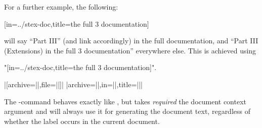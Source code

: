 For a further example, the following:
\begin{center}
    [in=../stex-doc,title={the full \sTeX{}3 documentation}]
\end{center}
will say ``Part III'' (and link accordingly) in the full documentation,
and ``Part III (Extensions) in the full \sTeX{}3 documentation''
everywhere else. This is achieved using

\stexcode"[in=../stex-doc,title={the full \sTeX{}3 documentation}]".

\begin{function}{\extref}
    \begin{syntax} |[archive=||,file=||]|%
        |{archive=||,in=||,title=||}| \end{syntax}
    The -command behaves exactly like , but takes
    \emph{required} the document context argument and will always use it
    for generating the document text, regardless of whether the label
    occurs in the current document.
\end{function}


